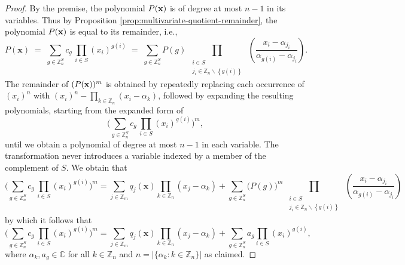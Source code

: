 \begin{proof}
  By the premise, the polynomial $P({\bf x})$ is of degree at most $n-1$
in its variables. Thus by Proposition \ref{prop:multivariate-quotient-remainder}, the polynomial $P({\bf x})$
is equal to its remainder, i.e.,
\begin{equation}
P(\mathbf{x})\;=\;\sum_{g\in\mathbb{Z}_{n}^{S}}c_{g}\,\prod_{i\in S}(x_{i})^{g(i)}\;=\;\sum_{g\in\mathbb{Z}_{n}^{S}}P(g)\prod_{\begin{array}{c}
\substack{i\in S\\
j_{i}\in\mathbb{Z}_{n}\backslash\left\{ g(i)\right\} 
}
\end{array}}\left(\frac{x_{i}-\alpha_{j_{i}}}{\alpha_{g(i)}-\alpha_{j_{i}}}\right).
\end{equation}
 The remainder of $(P({\bf x}))^m$ is obtained by repeatedly replacing each occurrence
of $(x_{i})^{n}$ with $(x_{i})^{n}-\underset{k\in\mathbb{Z}_{n}}{\prod}(x_{i}-\alpha_{k})$, followed by expanding the resulting polynomials, starting from the
expanded form of 
\begin{equation}
\bigg(\sum_{g\in\mathbb{Z}_{n}^{S}}c_{g}\,\prod_{i\in S}(x_{i})^{g(i)}\bigg)^{m},
\end{equation}
until we obtain a polynomial of degree at most $n-1$ in each variable.
The transformation never introduces a variable indexed by a member
of the complement of $S$. We obtain that 
\[
\bigg(\sum_{g\in\mathbb{Z}_{n}^{S}}c_{g}\,\prod_{i\in S}(x_{i})^{g(i)}\bigg)^{m}=\sum_{j\in\mathbb{Z}_{m}}q_{j}(\mathbf{x})\prod_{k\in\mathbb{Z}_{n}}(x_{j}-\alpha_{k})+\sum_{g\in\mathbb{Z}_{n}^{S}}\big(P(g)\big)^{m}\prod_{\begin{array}{c}
\substack{i\in S\\
j_{i}\in\mathbb{Z}_{n}\backslash\left\{ g(i)\right\} 
}
\end{array}}\left(\frac{x_{i}-\alpha_{j_{i}}}{\alpha_{g(i)}-\alpha_{j_{i}}}\right)
\]
by which it follows that 
\begin{equation}
\bigg(\sum_{g\in\mathbb{Z}_{n}^{S}}c_{g}\,\prod_{i\in S}(x_{i})^{g(i)}\bigg)^{m}=\sum_{j\in\mathbb{Z}_{m}}q_{j}(\mathbf{x})\prod_{k\in\mathbb{Z}_{n}}(x_{j}-\alpha_{k})+\sum_{g\in\mathbb{Z}_{n}^{S}}a_{g}\prod_{i\in S}(x_{i})^{g(i)},
\end{equation}
where $\alpha_k, a_g\in \mathbb{C}$ for all $k\in \mathbb{Z}_n$ and $n=\left|\big\{\alpha_{k}:k\in\mathbb{Z}_{n}\big\}\right|$
as claimed.
\end{proof}

